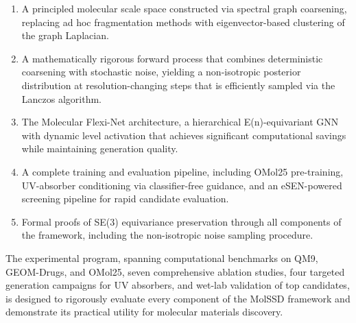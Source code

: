 \documentclass[12pt,a4paper]{article}
\begin{document}
\begin{enumerate}
    \item A principled molecular scale space constructed via spectral graph coarsening, replacing ad hoc fragmentation methods with eigenvector-based clustering of the graph Laplacian.

    \item A mathematically rigorous forward process that combines deterministic coarsening with stochastic noise, yielding a non-isotropic posterior distribution at resolution-changing steps that is efficiently sampled via the Lanczos algorithm.

    \item The Molecular Flexi-Net architecture, a hierarchical E(n)-equivariant GNN with dynamic level activation that achieves significant computational savings while maintaining generation quality.

    \item A complete training and evaluation pipeline, including OMol25 pre-training, UV-absorber conditioning via classifier-free guidance, and an eSEN-powered screening pipeline for rapid candidate evaluation.

    \item Formal proofs of SE(3) equivariance preservation through all components of the framework, including the non-isotropic noise sampling procedure.
\end{enumerate}

The experimental program, spanning computational benchmarks on QM9, GEOM-Drugs, and OMol25, seven comprehensive ablation studies, four targeted generation campaigns for UV absorbers, and wet-lab validation of top candidates, is designed to rigorously evaluate every component of the MolSSD framework and demonstrate its practical utility for molecular materials discovery.



\end{document}
